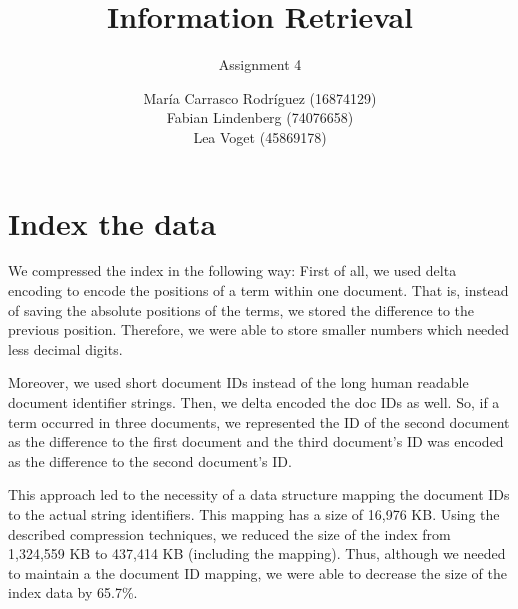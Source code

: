 \documentclass[a4paper,11pt,oneside]{book}
\title{Information Retrieval }
\subtitle{Assignment 4}
\author{ María Carrasco Rodríguez (16874129) \\
		Fabian Lindenberg (74076658) \\
		Lea Voget (45869178)}
\begin{document}
\kostspieligmaketitle


\setcounter{chapter}{2}
\chapter{Index the data}

We compressed the index in the following way: First of all, we used delta encoding to encode the positions of a term within one document. That is, instead of saving the absolute positions of the terms, we stored the difference to the previous position. Therefore, we were able to store smaller numbers which needed less decimal digits.

Moreover, we used short document IDs instead of the long human readable document identifier strings. Then, we delta encoded the doc IDs as well. So, if a term occurred in three documents, we represented the ID of the second document as the difference to the first document and the third document's ID was encoded as the difference to the second document's ID.

This approach led to the necessity of a data structure mapping the document IDs to the actual string identifiers. This mapping has a size of 16,976 KB. Using the described compression techniques, we reduced the size of the index from 1,324,559 KB to 437,414 KB (including the mapping). Thus, although we needed to maintain a the document ID mapping, we were able to decrease the size of the index data by 65.7\%.
\end{document}
